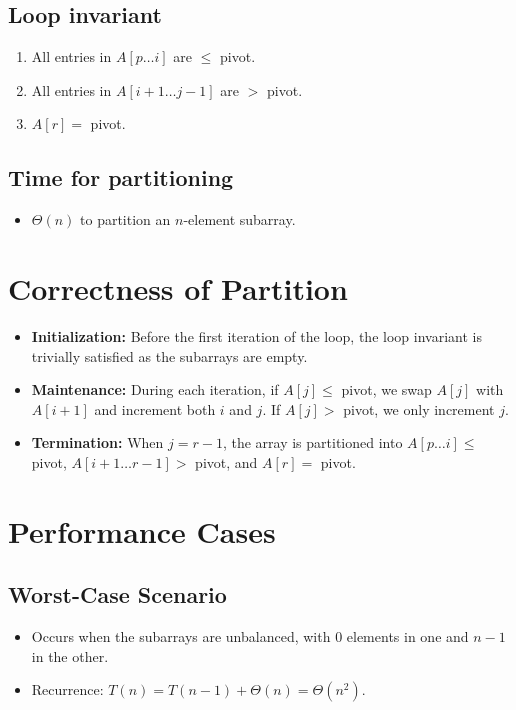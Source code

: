 \documentclass[12pt,openany]{book}
\theoremstyle{definition}
\begin{document}
\subsection{Loop invariant}
\begin{enumerate}
	\item All entries in \( A[p \ldots i] \) are \( \leq \) pivot.
	\item All entries in \( A[i+1 \ldots j-1] \) are \( > \) pivot.
	\item \( A[r] = \) pivot.
\end{enumerate}

\subsection{Time for partitioning}
\begin{itemize}
	\item \( \Theta(n) \) to partition an \( n \)-element subarray.
\end{itemize}

\section{Correctness of Partition}
\begin{itemize}
	\item \textbf{Initialization:} Before the first iteration of the loop, the loop invariant is trivially satisfied as the subarrays are empty.
	\item \textbf{Maintenance:} During each iteration, if \( A[j] \leq \) pivot, we swap \( A[j] \) with \( A[i+1] \) and increment both \( i \) and \( j \). If \( A[j] > \) pivot, we only increment \( j \).
	\item \textbf{Termination:} When \( j = r-1 \), the array is partitioned into \( A[p \ldots i] \leq \) pivot, \( A[i+1 \ldots r-1] > \) pivot, and \( A[r] = \) pivot.
\end{itemize}

\section{Performance Cases}
\subsection{Worst-Case Scenario}
\begin{itemize}
	\item Occurs when the subarrays are unbalanced, with 0 elements in one and \( n-1 \) in the other.
	\item Recurrence: \( T(n) = T(n-1) + \Theta(n) = \Theta(n^2) \).
\end{itemize}
\end{document}
